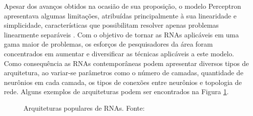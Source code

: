 Apesar dos avanços obtidos na ocasião de sua proposição, o modelo Perceptron apresentava algumas limitações, atribuídas principalmente à sua linearidade e simplicidade, características que possibilitam resolver apenas problemas linearmente separáveis \cite{Teresa:Livro}. Com o objetivo de tornar as RNAs aplicáveis em uma gama maior de problemas, os esforços de pesquisadores da área foram concentrados em aumentar e diversificar as técnicas aplicáveis a este modelo. Como consequência as RNAs contemporâneas podem apresentar diversos tipos de arquitetura, ao variar-se parâmetros como o número de camadas, quantidade de neurônios em cada camada, os tipos de conexões entre neurônios e topologia de rede. Alguns exemplos de arquiteturas podem ser encontrados na Figura \ref{fig:popular_archs}.

\begin{figure}[!ht]
	\caption{Arquiteturas populares de RNAs. Fonte: \cite{rnas_tipos}}
	\label{fig:popular_archs}


\end{figure}
